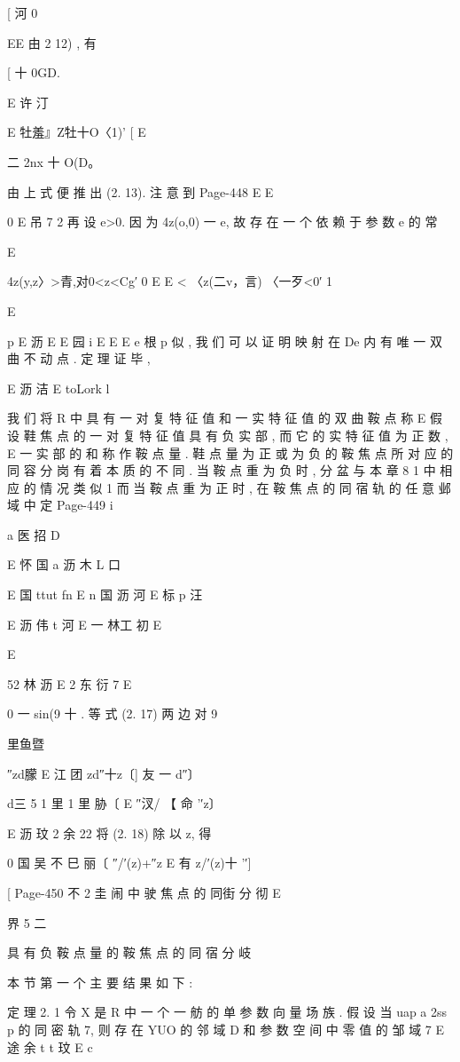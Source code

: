 {{{{{{{[ 河 0

EE
由 2 12) , 有

[  十 0GD.

E
许 汀

E 牡羞』Z牡十O〈1)' [
E

二 2nx 十 O(D。

由 上 式 便 推 出 (2. 13). 注 意 到
Page-448
E E

0
E 吊 7
2
再 设 e>0. 因 为 4z(o,0) 一 e, 故 存 在 一 个 依 赖 于 参 数 e 的 常

E

4z(y,z〉>青,对0<z<Cg′ 0
E
E <
〈z(二v，言) 〈一歹<0′ 1

E

p
E 沥
E
E 园
i
E E E e 根 p
似 , 我 们 可 以 证 明 映 射 在 De 内 有 唯 一 双 曲 不 动 点 . 定 理 证 毕 ,

E 沥 洁 E toLork l

我 们 将 R 中 具 有 一 对 复 特 征 值 和 一 实 特 征 值 的 双 曲 鞍 点 称
E
假 设 鞋 焦 点 的 一 对 复 特 征 值 具 有 负 实 部 , 而 它 的 实 特 征 值 为 正 数 ,
E 一
实 部 的 和 称 作 鞍 点 量 . 鞋 点 量 为 正 或 为 负 的 鞍 焦 点 所 对 应 的 同 容
分 岗 有 着 本 质 的 不 同 . 当 鞍 点 重 为 负 时 , 分 盆 与 本 章 8 1 中 相 应 的
情 况 类 似 1 而 当 鞍 点 重 为 正 时 , 在 鞍 焦 点 的 同 宿 轨 的 任 意 邺 域 中 定
Page-449
i

a
医 招
D

E 怀 国 a 沥 木
L 口

E 国 ttut fn
E n 国 沥 河
E 标 p 汪

E 沥 伟 t 河
E 一
林工 初
E

E

52 林 沥 E 2 东 衍 7
E

0
一 sin(9 十 . 等 式 (2. 17) 两 边 对 9

里鱼暨

″zd朦
E 江
团 zd″十z〔] 友 一 d″〕

d三 5 1 里 1 里
胁〔 E ″汊/ 【 命 '′z〕

E 沥 玟 2 余 22
将 (2. 18) 除 以 z, 得

0 国 吴 不 巳
丽〔 ″/′(z)+″z E 有 z/′(z)十 '′]

[
Page-450
不 2 圭 闹 中 驶 焦 点 的 同街 分 彻 E

界
5 二

具 有 负 鞍 点 量 的 鞍 焦 点 的 同 宿 分 岐

本 节 第 一 个 主 要 结 果 如 下 :

定 理 2. 1 令 X 是 R 中 一 个 一 舫 的 单 参 数 向 量 场 族 . 假 设 当
uap a 2ss p
的 同 密 轨 7, 则 存 在 YUO 的 邻 域 D 和 参 数 空 间 中 零 值 的 邹 域 7
E 途 余 t t
玟
E c

}}}}}}}
